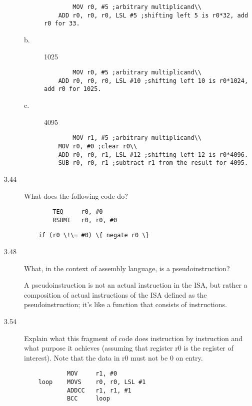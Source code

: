 \documentclass[letterpaper,10pt,titlepage]{article}
\begin{document}
\begin{description}
\begin{description}
        \begin{lstlisting}
        MOV r0, #5 ;arbitrary multiplicand\\
	ADD r0, r0, r0, LSL #5 ;shifting left 5 is r0*32, add r0 for 33.
    \end{lstlisting}
        \item[b.] 1025
        
        \begin{lstlisting}
        MOV r0, #5 ;arbitrary multiplicand\\
	ADD r0, r0, r0, LSL #10 ;shifting left 10 is r0*1024, add r0 for 1025.
    \end{lstlisting}
        \item[c.] 4095
        
        \begin{lstlisting}
        MOV r1, #5 ;arbitrary multiplicand\\
	MOV r0, #0 ;clear r0\\
	ADD r0, r0, r1, LSL #12 ;shifting left 12 is r0*4096.
	SUB r0, r0, r1 ;subtract r1 from the result for 4095.
    \end{lstlisting}
    \end{description}
    \item[3.44] What does the following code do?
    \begin{lstlisting}
        TEQ     r0, #0
        RSBMI   r0, r0, #0
    \end{lstlisting}
    
    \begin{lstlisting}
    if (r0 \!\= #0) \{ negate r0 \}
    \end{lstlisting}
    \item[3.48] What, in the context of assembly language, is a pseudoinstruction?
    
    A pseudoinstruction is not an actual instruction in the ISA, but rather a composition of actual instructions of the ISA defined as the pseudoinstruction; it's like a function that consists of instructions.
    \item[3.54] Explain what this fragment of code does instruction by instruction and what purpose it achieves (assuming that register r0 is the register of interest). Note that the data in r0 must not be 0 on entry.
    \begin{lstlisting}
            MOV     r1, #0
    loop    MOVS    r0, r0, LSL #1
            ADDCC   r1, r1, #1
            BCC     loop
    \end{lstlisting}
    

\end{description}
\end{document}
